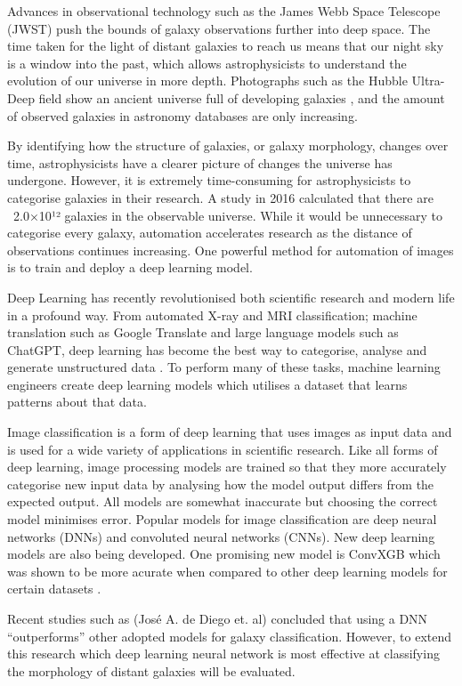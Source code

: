 \documentclass[12pt,runningheads]{llncs}
\begin{document}
Advances in observational technology such as the James Webb Space
Telescope (JWST) \cite{JWST} push the bounds of galaxy observations further
into deep space. The time taken for the light of distant galaxies to reach
us means that our night sky is a window into the past, which allows
astrophysicists to understand the evolution of our universe in more depth.
Photographs such as the Hubble Ultra-Deep field show an ancient universe full
of developing galaxies \cite{HUDF}, and the amount of observed galaxies in
astronomy databases are only increasing.

By identifying how the structure of galaxies, or galaxy morphology, changes over
time, astrophysicists have a clearer picture of changes the universe has
undergone. However, it is extremely time-consuming for astrophysicists to
categorise galaxies in their research. A study in 2016 \cite{EGND} calculated
that there are ~2.0×10¹² galaxies in the observable universe. While it would be
unnecessary to categorise every galaxy, automation accelerates research as
the distance of observations continues increasing. One powerful method for
automation of images is to train and deploy a deep learning model.

Deep Learning has recently revolutionised both scientific research and modern
life in a profound way. From automated X-ray and MRI classification;
machine translation such as Google Translate and large language models such as
ChatGPT, deep learning has become the best way to categorise, analyse and
generate unstructured data \cite{DLCTW}. To perform many of these tasks,
machine learning engineers create deep learning models which utilises a dataset
that learns patterns about that data.

Image classification is a form of deep learning that uses images as input data
and is used for a wide variety of applications in scientific research. Like
all forms of deep learning, image processing models are trained so that they
more accurately categorise new input data by analysing how the model output
differs from the expected output. All models are somewhat inaccurate but choosing
the correct model minimises error. Popular models for image classification are deep
neural networks (DNNs) and convoluted neural networks (CNNs). New deep learning
models are also being developed. One promising new model is ConvXGB which was
shown to be more acurate when compared to other deep learning models for certain
datasets \cite{CONVXGB}.

Recent studies such as (José A. de Diego et. al) \cite{GCDL} concluded that
using a DNN “outperforms” other adopted models for galaxy classification.
However, to extend this research which deep learning neural network is most
effective at classifying the morphology of distant galaxies will be evaluated.
\end{document}
